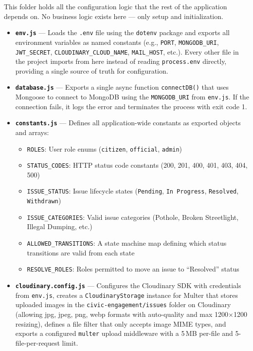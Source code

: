 \documentclass[12pt,a4paper]{article}
\begin{document}
This folder holds all the configuration logic that the rest of the application depends on. No business logic exists here --- only setup and initialization.

\begin{itemize}[leftmargin=1cm]
  \item \textbf{\texttt{env.js}} --- Loads the \texttt{.env} file using the \texttt{dotenv} package and exports all environment variables as named constants (e.g., \texttt{PORT}, \texttt{MONGODB\_URI}, \texttt{JWT\_SECRET}, \texttt{CLOUDINARY\_CLOUD\_NAME}, \texttt{MAIL\_HOST}, etc.). Every other file in the project imports from here instead of reading \texttt{process.env} directly, providing a single source of truth for configuration.

  \item \textbf{\texttt{database.js}} --- Exports a single async function \texttt{connectDB()} that uses Mongoose to connect to MongoDB using the \texttt{MONGODB\_URI} from \texttt{env.js}. If the connection fails, it logs the error and terminates the process with exit code 1.

  \item \textbf{\texttt{constants.js}} --- Defines all application-wide constants as exported objects and arrays:
  \begin{itemize}
    \item \texttt{ROLES}: User role enums (\texttt{citizen}, \texttt{official}, \texttt{admin})
    \item \texttt{STATUS\_CODES}: HTTP status code constants (200, 201, 400, 401, 403, 404, 500)
    \item \texttt{ISSUE\_STATUS}: Issue lifecycle states (\texttt{Pending}, \texttt{In Progress}, \texttt{Resolved}, \texttt{Withdrawn})
    \item \texttt{ISSUE\_CATEGORIES}: Valid issue categories (Pothole, Broken Streetlight, Illegal Dumping, etc.)
    \item \texttt{ALLOWED\_TRANSITIONS}: A state machine map defining which status transitions are valid from each state
    \item \texttt{RESOLVE\_ROLES}: Roles permitted to move an issue to ``Resolved'' status
  \end{itemize}

  \item \textbf{\texttt{cloudinary.config.js}} --- Configures the Cloudinary SDK with credentials from \texttt{env.js}, creates a \texttt{CloudinaryStorage} instance for Multer that stores uploaded images in the \texttt{civic-engagement/issues} folder on Cloudinary (allowing jpg, jpeg, png, webp formats with auto-quality and max 1200$\times$1200 resizing), defines a file filter that only accepts image MIME types, and exports a configured \texttt{multer} upload middleware with a 5\,MB per-file and 5-file-per-request limit.
\end{itemize}
\end{document}
